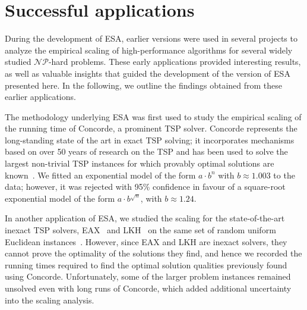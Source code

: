 \documentclass[aic]{iosart2x}
\begin{document}
\section{Successful applications}
\label{sec:Successful Applications}

During the development of ESA, earlier versions were used in several projects to analyze the empirical scaling of high-performance algorithms for several widely studied $\mathcal{NP}$-hard problems. 
These early applications provided interesting results, as well as valuable insights that guided the development of the version of ESA presented here.
In the following, we outline the findings obtained from these earlier applications.

The methodology underlying ESA was first used to study the empirical scaling of the running time of Concorde, a prominent TSP solver.
Concorde represents the long-standing state of the art in exact TSP solving; it incorporates mechanisms based on over 50 years of research on the TSP and has been used to solve the largest non-trivial TSP instances for which provably optimal solutions are known~\cite{AppEtAl06,AppEtAl12}.
We fitted an exponential model of the form $a\cdot b^n$ with $b \approx 1.003$ to the data; however, it was rejected with 95\% confidence in favour of a square-root exponential model of the form $a\cdot b^{\sqrt{n}}$, with $b \approx 1.24$. 

In another application of ESA, we studied the scaling for the state-of-the-art inexact TSP solvers, EAX~\cite{NagKob13} and LKH~\cite{helsgaun2000effective} on the same set of random uniform Euclidean instances~\cite{DubEtAl15}. However, since EAX and LKH are inexact solvers, they cannot prove the optimality of the solutions they find, and hence we recorded the running times required to find the optimal solution qualities previously found using Concorde. Unfortunately, some of the larger problem instances remained unsolved even with long runs of Concorde, which added additional uncertainty into the scaling analysis.
\end{document}
